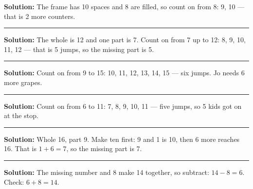 \documentclass[12pt]{article}
\begin{document}



\textbf{Solution:} The frame has 10 spaces and 8 are filled, so count on from
8: 9, 10 --- that is 2 more counters. 

\vspace{0.3cm}\noindent\rule{\linewidth}{0.2pt}\vspace{0.1cm}


\textbf{Solution:} The whole is 12 and one part is 7. Count on from 7 up to
12: 8, 9, 10, 11, 12 --- that is 5 jumps, so the missing part is 5. 

\vspace{0.3cm}\noindent\rule{\linewidth}{0.2pt}\vspace{0.1cm}


\textbf{Solution:} Count on from 9 to 15: 10, 11, 12, 13, 14, 15 --- six
jumps. Jo needs 6 more grapes. 

\vspace{0.3cm}\noindent\rule{\linewidth}{0.2pt}\vspace{0.1cm}


\textbf{Solution:} Count on from 6 to 11: 7, 8, 9, 10, 11 --- five jumps, so
5 kids got on at the stop. 

\vspace{0.3cm}\noindent\rule{\linewidth}{0.2pt}\vspace{0.1cm}


\textbf{Solution:} Whole 16, part 9. Make ten first: 9 and 1 is 10, then 6
more reaches 16. That is $1 + 6 = 7$, so the missing part is 7. 

\vspace{0.3cm}\noindent\rule{\linewidth}{0.2pt}\vspace{0.1cm}


\textbf{Solution:} The missing number and 8 make 14 together, so subtract:
$14 - 8 = 6$. Check: $6 + 8 = 14$. 
\end{document}
